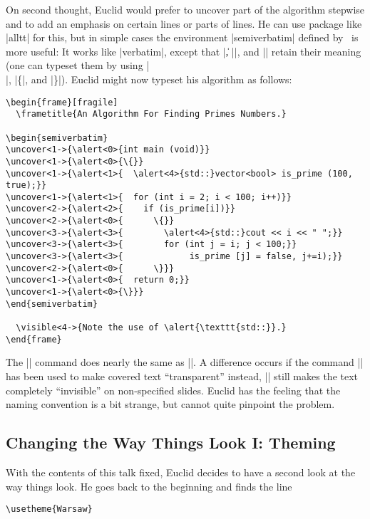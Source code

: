 On second thought, Euclid would prefer to uncover part of the algorithm stepwise and to add an emphasis on certain lines or parts of lines. He can use package like |alltt| for this, but in simple cases the environment |{semiverbatim}| defined by \beamer\ is more useful: It works like |{verbatim}|, except that |\|, |{|, and |}| retain their meaning (one can typeset them by using |\\|, |\{|, and |\}|). Euclid might now typeset his algorithm as follows:
\begin{verbatim}
\begin{frame}[fragile]
  \frametitle{An Algorithm For Finding Primes Numbers.}

\begin{semiverbatim}
\uncover<1->{\alert<0>{int main (void)}}
\uncover<1->{\alert<0>{\{}}
\uncover<1->{\alert<1>{  \alert<4>{std::}vector<bool> is_prime (100, true);}}
\uncover<1->{\alert<1>{  for (int i = 2; i < 100; i++)}}
\uncover<2->{\alert<2>{    if (is_prime[i])}}
\uncover<2->{\alert<0>{      \{}}
\uncover<3->{\alert<3>{        \alert<4>{std::}cout << i << " ";}}
\uncover<3->{\alert<3>{        for (int j = i; j < 100;}}
\uncover<3->{\alert<3>{             is_prime [j] = false, j+=i);}}
\uncover<2->{\alert<0>{      \}}}
\uncover<1->{\alert<0>{  return 0;}}
\uncover<1->{\alert<0>{\}}}
\end{semiverbatim}

  \visible<4->{Note the use of \alert{\texttt{std::}}.}
\end{frame}
\end{verbatim}
The |\visible| command does nearly the same as |\uncover|. A difference occurs if the command || has been used to make covered text ``transparent'' instead, |\visible| still makes the text completely ``invisible'' on non-specified slides. Euclid has the feeling that the naming convention is a bit strange, but cannot quite pinpoint the problem.


\subsection{Changing the Way Things Look I: Theming}

With the contents of this talk fixed, Euclid decides to have a second look at the way things look. He goes back to the beginning and finds the line
\begin{verbatim}
\usetheme{Warsaw}
\end{verbatim}

